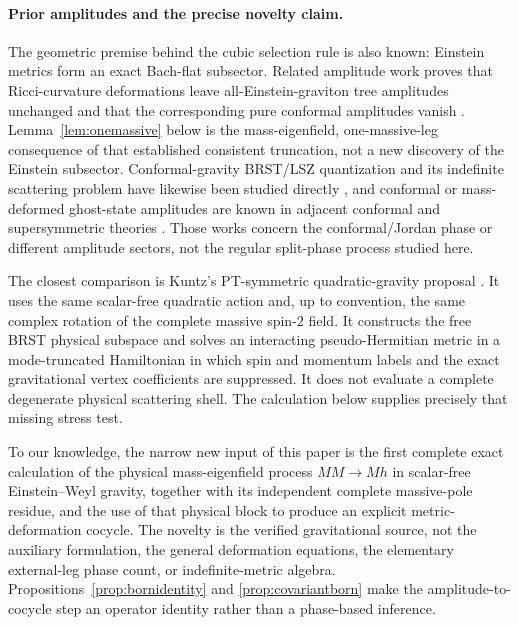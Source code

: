\documentclass[11pt]{article}
\theoremstyle{definition}
\theoremstyle{remark}
\begin{document}
\paragraph{Prior amplitudes and the precise novelty claim.}
The geometric premise behind the cubic selection rule is also known:
Einstein metrics form an exact Bach-flat subsector.  Related amplitude
work proves that Ricci-curvature deformations leave all-Einstein-graviton
tree amplitudes unchanged and that the corresponding pure conformal
amplitudes vanish \cite{DonaEtAl}.  Lemma~\ref{lem:onemassive} below is
the mass-eigenfield, one-massive-leg consequence of that established
consistent truncation, not a new discovery of the Einstein subsector.
Conformal-gravity BRST/LSZ quantization and its indefinite scattering
problem have likewise been studied directly \cite{KuboKuntz}, and
conformal or mass-deformed ghost-state amplitudes are known in adjacent
conformal and supersymmetric theories
\cite{AdamoNakachTseytlin,JohanssonMogullTeng}.  Those works concern the
conformal/Jordan phase or different amplitude sectors, not the regular
split-phase process studied here.

The closest comparison is Kuntz's PT-symmetric quadratic-gravity
proposal \cite{KuntzPTGravity}.  It uses the same scalar-free quadratic
action and, up to convention, the same complex rotation of the complete
massive spin-$2$ field.  It constructs the free BRST physical subspace
and solves an interacting pseudo-Hermitian metric in a mode-truncated
Hamiltonian in which spin and momentum labels and the exact gravitational
vertex coefficients are suppressed.  It does not evaluate a complete
degenerate physical scattering shell.  The calculation below supplies
precisely that missing stress test.

To our knowledge, the narrow new input of this paper is the first
complete exact calculation of the physical mass-eigenfield process
$MM\to Mh$ in scalar-free Einstein--Weyl gravity, together with its
independent complete massive-pole residue, and the use of that physical
block to produce an explicit metric-deformation cocycle.  The novelty is
the verified gravitational source, not the auxiliary formulation, the
general deformation equations, the elementary external-leg phase count,
or indefinite-metric algebra.  Propositions~\ref{prop:bornidentity} and
\ref{prop:covariantborn} make the amplitude-to-cocycle step an operator
identity rather than a phase-based inference.
\end{document}
